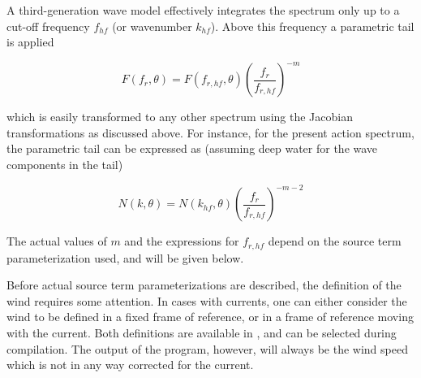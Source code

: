 \vspace{\baselineskip} \noindent
A third-generation wave model effectively integrates the spectrum only up to a
cut-off frequency $f_{hf}$ (or wavenumber $k_{hf}$). Above this frequency a
parametric tail is applied \citep[e.g.,][]{art:WAM88}


\begin{equation}
F(f_r,\theta) = F(f_{r,hf},\theta) \left ( \frac{f_r}{f_{r,hf}}
\right ) ^{-m} \label{eq:tail_E_f}
\end{equation}

\noindent
which is easily transformed to any other spectrum using the Jacobian
transformations as discussed above. For instance, for the present action
spectrum, the parametric tail can be expressed as (assuming deep water for the
wave components in the tail)


\begin{equation}
N(k,\theta) = N(k_{hf},\theta) \left ( \frac{f_r}{f_{r,hf}}
\right ) ^{-m-2} \label{eq:tail_N_k}
\end{equation}

\noindent
The actual values of $m$ and the expressions for $f_{r,hf}$ depend on the
source term parameterization used, and will be given below.

\vspace{\baselineskip} \noindent
Before actual source term parameterizations are described, the definition of
the wind requires some attention. In cases with currents, one can either
consider the wind to be defined in a fixed frame of reference, or in a frame
of reference moving with the current. Both definitions are available in \ws,
and can be selected during compilation. The output of the program, however,
will always be the wind speed which is not in any way corrected for the
current.